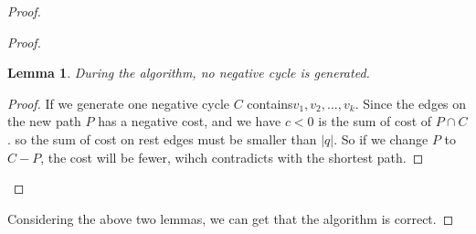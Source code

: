 \documentclass[12pt,a4paper]{article}
\newtheorem{lemma}[theorem]{Lemma}
\theoremstyle{definition}
\begin{document}
\begin{enumerate}
\begin{proof}
\begin{proof}
		\begin{lemma}
	  During the algorithm, no negative cycle is generated.
		
		\end{lemma}


		\begin{proof}
			If we generate one negative cycle $C$ contains$v_1, v_2, ..., v_k$. Since the edges on the new path $P$ has a negative cost, and we have $c < 0$ is the sum of cost of $P \cap C$.
			so the sum of cost on rest edges must be smaller than $|q|$. So if we change $P$ to $C - P$, the cost will be fewer, wihch contradicts with the shortest path. 
		\end{proof}

	\end{proof}
   		Considering the above two lemmas, we can get that the algorithm is correct.	


    \end{proof}


 
\newpage
\end{enumerate}






\end{document}
